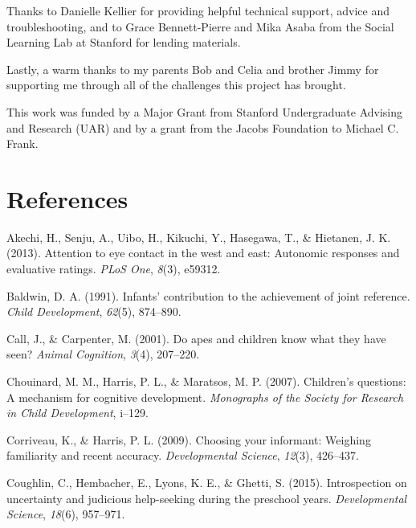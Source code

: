 \documentclass[,man,floatsintext]{apa6}
\begin{document}
Thanks to Danielle Kellier for providing helpful technical support, advice and troubleshooting, and to Grace Bennett-Pierre and Mika Asaba from the Social Learning Lab at Stanford for lending materials.

Lastly, a warm thanks to my parents Bob and Celia and brother Jimmy for supporting me through all of the challenges this project has brought.

This work was funded by a Major Grant from Stanford Undergraduate Advising and Research (UAR) and by a grant from the Jacobs Foundation to Michael C. Frank.

\newpage

\hypertarget{references}{%
\section{References}\label{references}}

\setlength{\parindent}{-0.5in}
\setlength{\leftskip}{0.5in}

\hypertarget{refs}{}
\leavevmode\hypertarget{ref-akechi2013attention}{}%
Akechi, H., Senju, A., Uibo, H., Kikuchi, Y., Hasegawa, T., \& Hietanen, J. K. (2013). Attention to eye contact in the west and east: Autonomic responses and evaluative ratings. \emph{PLoS One}, \emph{8}(3), e59312.

\leavevmode\hypertarget{ref-baldwin1991infants}{}%
Baldwin, D. A. (1991). Infants' contribution to the achievement of joint reference. \emph{Child Development}, \emph{62}(5), 874--890.

\leavevmode\hypertarget{ref-call2001apes}{}%
Call, J., \& Carpenter, M. (2001). Do apes and children know what they have seen? \emph{Animal Cognition}, \emph{3}(4), 207--220.

\leavevmode\hypertarget{ref-chouinard2007children}{}%
Chouinard, M. M., Harris, P. L., \& Maratsos, M. P. (2007). Children's questions: A mechanism for cognitive development. \emph{Monographs of the Society for Research in Child Development}, i--129.

\leavevmode\hypertarget{ref-corriveau2009choosing}{}%
Corriveau, K., \& Harris, P. L. (2009). Choosing your informant: Weighing familiarity and recent accuracy. \emph{Developmental Science}, \emph{12}(3), 426--437.

\leavevmode\hypertarget{ref-coughlin2015introspection}{}%
Coughlin, C., Hembacher, E., Lyons, K. E., \& Ghetti, S. (2015). Introspection on uncertainty and judicious help-seeking during the preschool years. \emph{Developmental Science}, \emph{18}(6), 957--971.
\end{document}
